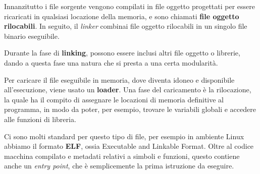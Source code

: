     Innanzitutto i file sorgente vengono compilati in file oggetto progettati per essere ricaricati in qualsiasi locazione della memoria, e sono chiamati \textbf{file oggetto rilocabili}. In seguito, il \textit{linker} combinai file oggetto rilocabili in un singolo file binario eseguibile.
    
    Durante la fase di \textbf{linking}, possono essere inclusi altri file oggetto o librerie, dando a questa fase una natura che si presta a una certa modularità.
    
    Per caricare il file eseguibile in memoria, dove diventa idoneo e disponibile all'esecuzione, viene usato un \textbf{loader}. Una fase del caricamento è la rilocazione, la quale ha il compito di assegnare le locazioni di memoria definitive al programma, in modo da poter, per esempio, trovare le variabili globali e accedere alle funzioni di libreria.
    
    Ci sono molti standard per questo tipo di file, per esempio in ambiente Linux abbiamo il formato \textbf{ELF}, ossia Executable and Linkable Format. Oltre al codice macchina compilato e metadati relativi a simboli e funzioni, questo contiene anche un \textit{entry point}, che è semplicemente la prima istruzione da eseguire.